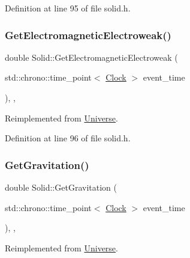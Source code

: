 Definition at line 95 of file solid.\+h.

\mbox{\label{class_solid_aff7ec13bcc584d8330e3f3a1b371bbe6}} 
\subsubsection{\texorpdfstring{Get\+Electromagnetic\+Electroweak()}{GetElectromagneticElectroweak()}}
{\footnotesize\ttfamily double Solid\+::\+Get\+Electromagnetic\+Electroweak (\begin{DoxyParamCaption}\item[{std\+::chrono\+::time\+\_\+point$<$ \hyperlink{universe_8h_a0ef8d951d1ca5ab3cfaf7ab4c7a6fd80}{Clock} $>$}]{event\+\_\+time }\end{DoxyParamCaption})\hspace{0.3cm}{\ttfamily [inline]}, {\ttfamily [final]}, {\ttfamily [virtual]}}



Reimplemented from \hyperlink{class_universe_a9f099605c082e7fa755787a6a8cab7ba}{Universe}.



Definition at line 96 of file solid.\+h.

\mbox{\label{class_solid_ab5ecb5598be93fe3cd2a21c0cfd363c8}} 
\subsubsection{\texorpdfstring{Get\+Gravitation()}{GetGravitation()}}
{\footnotesize\ttfamily double Solid\+::\+Get\+Gravitation (\begin{DoxyParamCaption}\item[{std\+::chrono\+::time\+\_\+point$<$ \hyperlink{universe_8h_a0ef8d951d1ca5ab3cfaf7ab4c7a6fd80}{Clock} $>$}]{event\+\_\+time }\end{DoxyParamCaption})\hspace{0.3cm}{\ttfamily [inline]}, {\ttfamily [final]}, {\ttfamily [virtual]}}



Reimplemented from \hyperlink{class_universe_ab0404e774ee0ed66b597ff5b8e989446}{Universe}.



